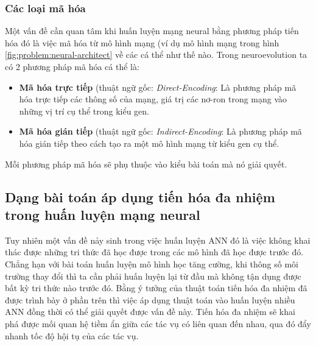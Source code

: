     \subsubsection{Các loại mã hóa}
    Một vấn đề cần quan tâm khi huấn luyện mạng neural bằng phương pháp tiến hóa đó là việc mã hóa từ mô hình mạng (ví dụ mô hình mạng trong hình \ref{fig:problem:neural-architect} về các cá thể như thế nào. Trong neuroevolution ta có 2 phương pháp mã hóa cá thể là:
    \begin{itemize}
        \item \textbf{Mã hóa trực tiếp} (thuật ngữ gốc: \emph{Direct-Encoding}: Là phương pháp mã hóa trực tiếp các thông số của mạng, giá trị các nơ-ron trong mạng vào những vị trí cụ thể trong kiểu gen.
        \item \textbf{Mã hóa gián tiếp} (thuật ngữ gốc: \emph{Indirect-Encoding}: Là phương pháp mã hóa gián tiếp theo cách tạo ra một mô hình mạng từ kiểu gen cụ thể.
    \end{itemize}
    Mỗi phương pháp mã hóa sẽ phụ thuộc vào kiểu bài toán mà nó giải quyết. 
    \subsection{Dạng bài toán áp dụng tiến hóa đa nhiệm trong huấn luyện mạng neural}
    Tuy nhiên một vấn đề nảy sinh trong việc huấn luyện ANN đó là việc không khai thác được những tri thức đã học được trong các mô hình đã học được trước đó. Chẳng hạn với bài toán huấn luyện mô hình học tăng cường, khi thông số môi trường thay đổi thì ta cần phải huấn luyện lại từ đầu mà không tận dụng được bất kỳ tri thức nào trước đó.
    Bằng ý tưởng của thuật toán tiến hóa đa nhiệm đã được trình bày ở phần trên thì việc áp dụng thuật toán vào huấn luyện nhiều ANN đồng thời có thể giải quyết được vấn đề này. Tiến hóa đa nhiệm sẽ khai phá được mối quan hệ tiềm ẩn giữa các tác vụ có liên quan đến nhau, qua đó đẩy nhanh tốc độ hội tụ của các tác vụ.
    
